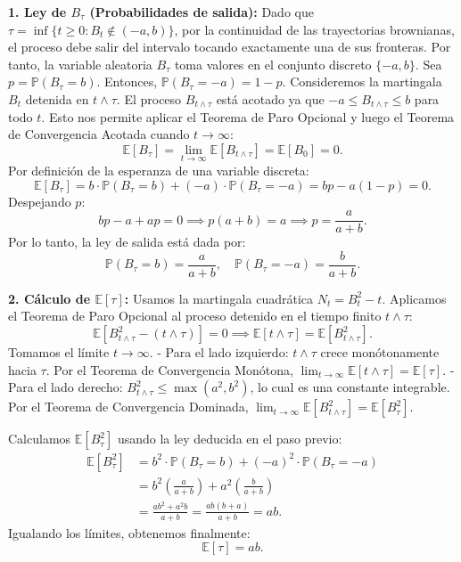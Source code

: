 \documentclass[11pt, letterpaper]{article}
\begin{document}
\begin{solucion}
    \textbf{1. Ley de $B_\tau$ (Probabilidades de salida):}
    Dado que $\tau = \inf\{t \ge 0 : B_t \notin (-a, b)\}$, por la continuidad de las trayectorias brownianas, el proceso debe salir del intervalo tocando exactamente una de sus fronteras. Por tanto, la variable aleatoria $B_\tau$ toma valores en el conjunto discreto $\{-a, b\}$.
    Sea $p = \mathbb{P}(B_\tau = b)$. Entonces, $\mathbb{P}(B_\tau = -a) = 1 - p$.
    Consideremos la martingala $B_t$ detenida en $t \wedge \tau$. El proceso $B_{t \wedge \tau}$ está acotado ya que $-a \le B_{t \wedge \tau} \le b$ para todo $t$. Esto nos permite aplicar el Teorema de Paro Opcional y luego el Teorema de Convergencia Acotada cuando $t \to \infty$:
    \[ \mathbb{E}[B_\tau] = \lim_{t \to \infty} \mathbb{E}[B_{t \wedge \tau}] = \mathbb{E}[B_0] = 0. \]
    Por definición de la esperanza de una variable discreta:
    \[ \mathbb{E}[B_\tau] = b \cdot \mathbb{P}(B_\tau = b) + (-a) \cdot \mathbb{P}(B_\tau = -a) = bp - a(1 - p) = 0. \]
    Despejando $p$:
    \[ bp - a + ap = 0 \implies p(a + b) = a \implies p = \frac{a}{a+b}. \]
    Por lo tanto, la ley de salida está dada por:
    \[ \mathbb{P}(B_\tau = b) = \frac{a}{a+b}, \quad \mathbb{P}(B_\tau = -a) = \frac{b}{a+b}. \]

    \textbf{2. Cálculo de $\mathbb{E}[\tau]$:}
    Usamos la martingala cuadrática $N_t = B_t^2 - t$. Aplicamos el Teorema de Paro Opcional al proceso detenido en el tiempo finito $t \wedge \tau$:
    \[ \mathbb{E}[B_{t \wedge \tau}^2 - (t \wedge \tau)] = 0 \implies \mathbb{E}[t \wedge \tau] = \mathbb{E}[B_{t \wedge \tau}^2]. \]
    Tomamos el límite $t \to \infty$. 
    - Para el lado izquierdo: $t \wedge \tau$ crece monótonamente hacia $\tau$. Por el Teorema de Convergencia Monótona, $\lim_{t \to \infty} \mathbb{E}[t \wedge \tau] = \mathbb{E}[\tau]$.
    - Para el lado derecho: $B_{t \wedge \tau}^2 \le \max(a^2, b^2)$, lo cual es una constante integrable. Por el Teorema de Convergencia Dominada, $\lim_{t \to \infty} \mathbb{E}[B_{t \wedge \tau}^2] = \mathbb{E}[B_\tau^2]$.
    
    Calculamos $\mathbb{E}[B_\tau^2]$ usando la ley deducida en el paso previo:
    \begin{align*}
        \mathbb{E}[B_\tau^2] &= b^2 \cdot \mathbb{P}(B_\tau = b) + (-a)^2 \cdot \mathbb{P}(B_\tau = -a) \\
        &= b^2 \left( \frac{a}{a+b} \right) + a^2 \left( \frac{b}{a+b} \right) \\
        &= \frac{ab^2 + a^2b}{a+b} = \frac{ab(b + a)}{a+b} = ab.
    \end{align*}
    Igualando los límites, obtenemos finalmente:
    \[ \mathbb{E}[\tau] = ab. \]


\end{solucion}
\end{document}
